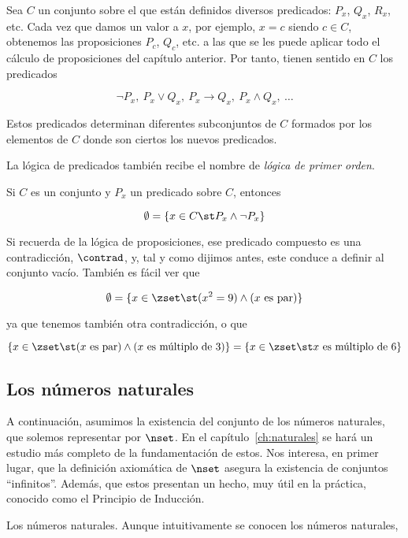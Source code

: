 Sea $C$ un conjunto sobre el que están definidos diversos predicados: $P_x$,
$Q_x$, $R_x$, etc. Cada vez que damos un valor a $x$, por ejemplo, $x = c$
siendo $c \in C$, obtenemos las proposiciones $P_c$, $Q_c$, etc. a las que
se les puede aplicar todo el cálculo de proposiciones del capítulo anterior.
Por tanto, tienen sentido en $C$ los predicados

\[ \neg P_x, \ P_x \lor Q_x, \ P_x \to Q_x, \ P_x \land Q_x, \ \ldots \]

\noindent Estos predicados determinan diferentes subconjuntos de $C$
formados por los elementos de $C$ donde son ciertos los nuevos predicados.

La lógica de predicados también recibe el nombre de \emph{lógica de primer
orden}.

\begin{example}
  Si $C$ es un conjunto y $P_x$ un predicado sobre $C$, entonces

  \[ \emptyset = \{x \in C \st P_x \land \neg P_x\} \]

  Si recuerda de la lógica de proposiciones, ese predicado compuesto es una
  contradicción, $\contrad$, y, tal y como dijimos antes, este conduce a
  definir al conjunto vacío. También es fácil ver que

  \[ \emptyset = \{x \in \zset \st (x^2 = 9) \land (x \ \text{es par})\} \]

  \noindent ya que tenemos también otra contradicción, o que

  \[ \{x \in \zset \st (x \ \text{es par}) \land (x \ \text{es múltiplo de
  3})\} = \{x \in \zset \st x \ \text{es múltiplo de 6}\} \]
\end{example}



\subsection{Los números naturales}

A continuación, asumimos la existencia del conjunto de los números
naturales, que solemos representar por $\nset$. En el
capítulo~\ref{ch:naturales} se hará un estudio más completo de la
fundamentación de estos. Nos interesa, en primer lugar, que la definición
axiomática de $\nset$ asegura la existencia de conjuntos ``infinitos''.
Además, que estos presentan un hecho, muy útil en la práctica, conocido como
el Principio de Inducción.

Los números naturales. Aunque intuitivamente se conocen los números
naturales,

